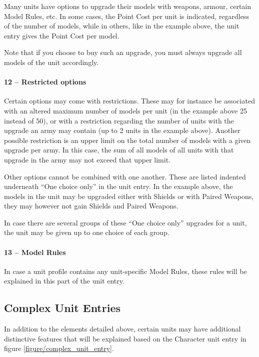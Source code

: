 Many units have options to upgrade their models with weapons, armour, certain Model Rules, etc. In some cases, the Point Cost per unit is indicated, regardless of the number of models, while in others, like in the example above, the unit entry gives the Point Cost per model.

Note that if you choose to buy such an upgrade, you must always upgrade all models of the unit accordingly.

\paragraph{12 -- Restricted options}

Certain options may come with restrictions. These may for instance be associated with an altered maximum number of models per unit (in the example above 25 instead of 50), or with a restriction regarding the number of units with the upgrade an army may contain (up to 2 units in the example above). Another possible restriction is an upper limit on the total number of models with a given upgrade per army. In this case, the sum of all models of all units with that upgrade in the army may not exceed that upper limit.

Other options cannot be combined with one another. These are listed indented underneath \enquote{One choice only} in the unit entry. In the example above, the models in the unit may be upgraded either with Shields or with Paired Weapons, they may however not gain Shields and Paired Weapons.

In case there are several groups of these \enquote{One choice only} upgrades for a unit, the unit may be given up to one choice of each group.

\paragraph{13 -- Model Rules}

In case a unit profile contains any unit-specific Model Rules, these rules will be explained in this part of the unit entry.

\subsection{Complex Unit Entries}

In addition to the elements detailed above, certain units may have additional distinctive features that will be explained based on the Character unit entry in figure \ref{figure/complex_unit_entry}.

